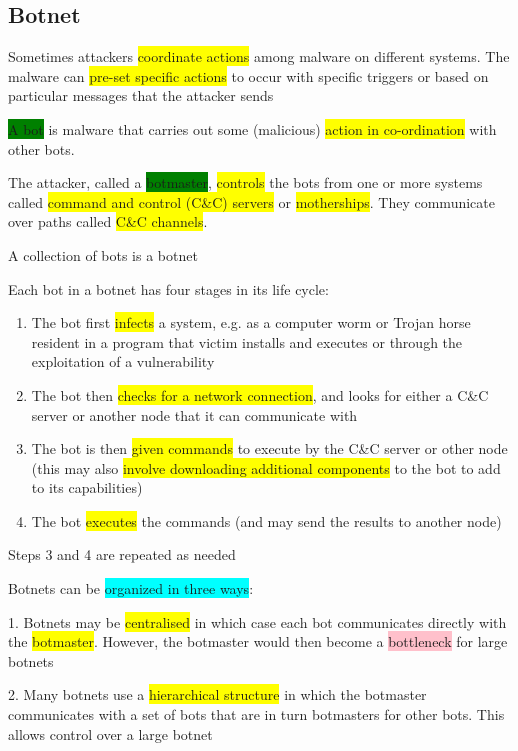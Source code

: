 \documentclass[]{project_plan}
\begin{document}
\subsection{Botnet}

Sometimes attackers \colorbox{yellow}{coordinate actions} among malware on different systems. The
malware can \colorbox{yellow}{pre-set specific actions} to occur with specific triggers or based on particular
messages that the attacker sends

\colorbox{green}{A bot} is malware that carries out some (malicious) \colorbox{yellow}{action in co-ordination} with other
bots.

The attacker, called a \colorbox{green}{botmaster}, \colorbox{yellow}{controls} the bots from one or more systems called
\colorbox{yellow}{command and control (C\&C) servers} or \colorbox{yellow}{motherships}. They communicate over paths called
\colorbox{yellow}{C\&C channels}.

A collection of bots is a botnet

Each bot in a botnet has four stages in its life cycle:
\begin{enumerate}
  \item The bot first \colorbox{yellow}{infects} a system, e.g. as a computer worm or Trojan horse resident in a program that
        victim installs and executes or through the exploitation of a vulnerability
  \item The bot then \colorbox{yellow}{checks for a network connection}, and looks for either a C\&C server or another node
        that it can communicate with
  \item The bot is then \colorbox{yellow}{given commands} to execute by the C\&C server or other node (this may also
        \colorbox{yellow}{involve downloading additional components} to the bot to add to its capabilities)
  \item The bot \colorbox{yellow}{executes} the commands (and may send the results to another node)
\end{enumerate}
Steps 3 and 4 are repeated as needed

Botnets can be \colorbox{cyan}{organized in three ways}:

1. Botnets may be \colorbox{yellow}{centralised} in which case each bot communicates directly with the
\colorbox{yellow}{botmaster}. However, the botmaster would then become a \colorbox{pink}{bottleneck} for large botnets

2. Many botnets use a \colorbox{yellow}{hierarchical structure} in which the botmaster communicates with a set
of bots that are in turn botmasters for other bots. This allows control over a large botnet
\end{document}
